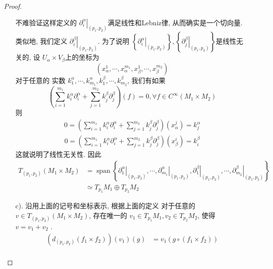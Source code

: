 \documentclass[../main.tex]{subfiles}
\begin{document}
\begin{proof}
\begin{enumerate}
\[        \] 不难验证这样定义的 \(  \left.  \partial _{i}^{\alpha } \right|_{\left( p_1,p_2 \right) }  \)满足线性和Lebniz律, 从而确实是一个切向量. 类似地, 我们定义 \(  \left.  \partial _{i}^{\beta } \right|_{\left( p_1,p_2 \right) }  \).  为了说明 \(  \left\{ \left.  \partial _{i}^{\alpha } \right|_{\left( p_1,p_2 \right) } \right\},\left\{  \left.  \partial _{j}^{\beta } \right|_{\left( p_1,p_2 \right) } \right\}  \)是线性无关的,   设 \(  U_{\alpha }\times V_{\beta }  \)上的坐标为 \[
        \left( x_{\alpha }^{1},\cdots ,x_{\alpha }^{m_1}, x_{\beta }^{1},\cdots ,x_{\beta }^{m_2} \right) 
        \]  对于任意的 实数 \(  k_1^{\alpha },\cdots ,k_{m_1}^{\alpha }, k_1^{\beta },\cdots ,k_{m_2}^{\beta }  \), 我们有如果\[
         \left( \sum _{i= 1}^{m_1} k_{i}^{\alpha } \partial _{i}^{\alpha }+ \sum _{j= 1}^{m_2} k_{j}^{\beta }\partial _{j}^{\beta }  \right)\left( f \right)= 0, \forall f\in C^{\infty}\left( M_1\times M_2 \right)  
        \] 则  \[
        \begin{aligned}
      0= \left(  \sum _{i= 1}^{m_1} k_{i}^{\alpha } \partial _{i}^{\alpha }+ \sum _{j= 1}^{m_2} k_{j}^{\beta }\partial _{j}^{\beta }  \right)\left(x_{\alpha }^{j}\right)= k_{j}^{\alpha }  
        \end{aligned}
        \]  \[
        \begin{aligned}
      0= \left(  \sum _{i= 1}^{m_1} k_{i}^{\alpha } \partial _{i}^{\alpha }+ \sum _{j= 1}^{m_2} k_{j}^{\beta }\partial _{j}^{\beta }  \right)\left(x_{\beta }^{i}\right)= k_{i}^{\beta }  
        \end{aligned}
        \] 这就说明了线性无关性. 因此 \[
       \begin{aligned}
        T_{\left( p_1,p_2 \right) }\left( M_1\times M_2 \right)&= \operatorname{span}\left\{ \left.  \partial _{1}^{\alpha } \right|_{\left( p_1,p_2 \right) },\cdots ,\left.  \partial _{m_1}^{\alpha } \right|_{\left( p_1,p_2 \right) },\left.  \partial _{1}^{\beta } \right|_{\left( p_1,p_2 \right) },\cdots , \left.  \partial _{m_2}^{\beta } \right|_{\left( p_1,p_2 \right) } \right\}  \\ 
        &\simeq T_{p_1}M_1\oplus  T_{p_2}M_2
       \end{aligned}
        \]
        \item[c).] 沿用上面的记号和坐标表示, 根据上面的定义 对于任意的 \(  v\in T_{\left( p_1,p_2 \right) }\left( M_1\times M_2 \right)   \), 存在唯一的 \(  v_1\in T_{p_1}M_1, v_2\in T_{p_2}M_2  \), 使得 \(  v= v_1+ v_2  \) .   \[
        \begin{aligned}
       \left(  d _{\left( p_1,p_2 \right) }\left( f_1\times f_2 \right) \right)\left( v_1 \right)\left( g \right)&=      v_1\left( g\circ \left( f_1\times f_2 \right)  \right) \\ 

\end{aligned}\]
\end{enumerate}
\end{proof}
\end{document}
